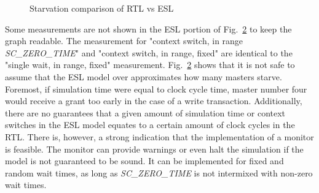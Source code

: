 \begin{figure}[hbt]
\begin{subfigure}{.5\textwidth}
  \label{fig:sub2}
\end{subfigure}
\caption{Starvation comparison of RTL vs ESL}
\label{fig:starvation}
\end{figure}

Some measurements are not shown in the ESL portion of Fig.~\ref{fig:starvation} to keep the graph readable. The measurement for "context switch, in range  \textit{SC\_ZERO\_TIME}" and "context switch, in range, fixed"  are identical to the "single wait, in range, fixed" measurement. 
Fig.~\ref{fig:starvation} shows that it is not safe to assume that the ESL model over approximates how many masters starve. Foremost, if simulation time were equal to clock cycle time, master number four would receive a grant too early in the case of a write transaction. Additionally, there are no guarantees that a given amount of simulation time or context switches in the ESL model equates to a certain amount of clock cycles in the RTL. There is, however, a strong indication that the implementation of a monitor is feasible. The monitor can provide warnings or even halt the simulation if the model is not guaranteed to be sound. It can be implemented for fixed and random wait times, as long as \textit{SC\_ZERO\_TIME} is not intermixed with non-zero wait times.     


